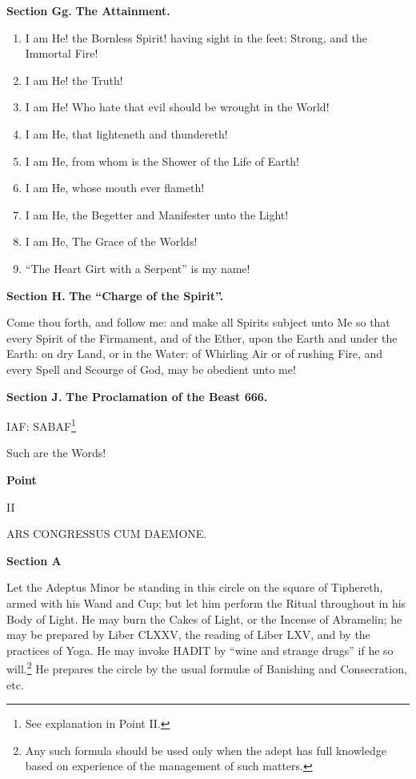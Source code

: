 
\textbf{Section Gg.} \hfill \textbf{The Attainment.}
\begin{enumerate}
\item I am He! the Bornless Spirit! having sight in the feet: Strong, and the Immortal Fire!
\item I am He! the Truth!
\item I am He! Who hate that evil should be wrought in the World!
\item I am He, that lighteneth and thundereth!
\item I am He, from whom is the Shower of the Life of Earth!
\item I am He, whose mouth ever flameth!
\item I am He, the Begetter and Manifester unto the Light!
\item I am He, The Grace of the Worlds!
\item \enquote{The Heart Girt with a Serpent} is my name!
\end{enumerate}


\textbf{Section H.} \hfill \textbf{The \enquote{Charge of the Spirit}.}


 Come thou forth, and follow me: and make all Spirits subject unto Me so that every Spirit of the Firmament, and of the Ether, upon the Earth and under the Earth: on dry Land, or in the Water: of Whirling Air or of rushing Fire, and every Spell and Scourge of God, may be obedient unto me!


\textbf{Section J.} \hfill \textbf{The Proclamation of the Beast 666.}

IAF: \hspace{0.25em} SABAF\footnote{See explanation in Point II.}

\hspace{1em} Such are the Words!

\pagebreak

\begin{center}
\textbf{Point}

II

ARS CONGRESSUS CUM DAEMONE.
\end{center}

\textbf{Section A}


Let the Adeptus Minor be standing in this circle on the square of Tiphereth, armed with his Wand and Cup; but let him perform the Ritual throughout in his Body of Light. He may burn the Cakes of Light, or the Incense of Abramelin; he may be prepared by Liber CLXXV, the reading of Liber LXV, and by the practices of Yoga. He may invoke HADIT by \enquote{wine and strange drugs} if he so will.\footnote{Any such formula should be used only when the adept has full knowledge based on experience of the management of such matters.} He prepares the circle by the usual formul\ae{} of Banishing and Consecration, etc.

